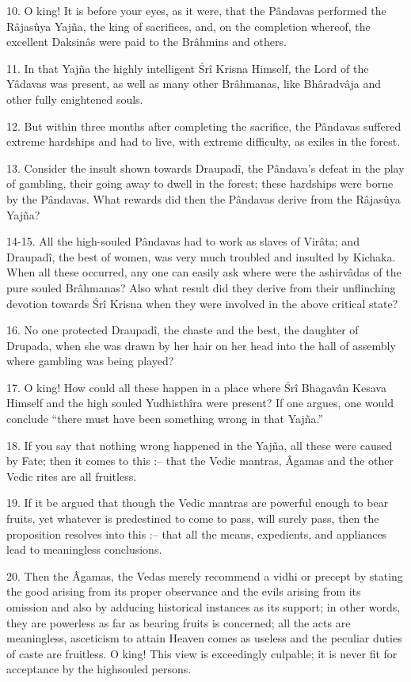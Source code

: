 10. O king! It is before your eyes, as it were, that the P\^andavas performed the R\^ajasûya Yaj\~na, the king of sacrifices, and, on the completion whereof, the excellent Daksin\^as were paid to the Br\^ahmins and others.

11. In that Yaj\~na the highly intelligent \'Sr\^i Krisna Himself, the Lord of the Y\^adavas was present, as well as many other Br\^ahmanas, like Bh\^aradv\^aja and other fully enightened souls.

12. But within three months after completing the sacrifice, the P\^andavas suffered extreme hardships and had to live, with extreme difficulty, as exiles in the forest.

13. Consider the insult shown towards Draupad\^i, the P\^andava's defeat in the play of gambling, their going away to dwell in the forest; these hardships were borne by the P\^andavas. What rewards did then the P\^andavas derive from the R\^ajasûya Yaj\~na?

14-15. All the high-souled P\^andavas had to work as slaves of Vir\^ata; and Draupad\^i, the best of women, was very much troubled and insulted by Kichaka. When all these occurred, any one can easily ask where were the ashirv\^adas of the pure souled Br\^ahmanas? Also what result did they derive from their unflinching devotion towards \'Sr\^i Krisna when they were involved in the above critical state?

16. No one protected Draupad\^i, the chaste and the best, the daughter of Drupada, when she was drawn by her hair on her head into the hall of assembly where gambling was being played?

17. O king! How could all these happen in a place where \'Sr\^i Bhagav\^an Kesava Himself and the high souled Yudhisth\^ira were present? If one argues, one would conclude ``there must have been something wrong in that Yaj\~na.''

18. If you say that nothing wrong happened in the Yaj\~na, all these were caused by Fate; then it comes to this :-- that the Vedic mantras, Âgamas and the other Vedic rites are all fruitless.

19. If it be argued that though the Vedic mantras are powerful enough to bear fruits, yet whatever is predestined to come to pass, will surely pass, then the proposition resolves into this :-- that all the means, expedients, and appliances lead to meaningless conclusions.

20. Then the Âgamas, the Vedas merely recommend a vidhi or precept by stating the good arising from its proper observance and the evils arising from its omission and also by adducing historical instances as its support; in other words, they are powerless as far as bearing fruits is concerned; all the acts are meaningless, asceticism to attain Heaven comes as useless and the peculiar duties of caste are fruitless. O king! This view is exceedingly culpable; it is never fit for acceptance by the highsouled persons.

